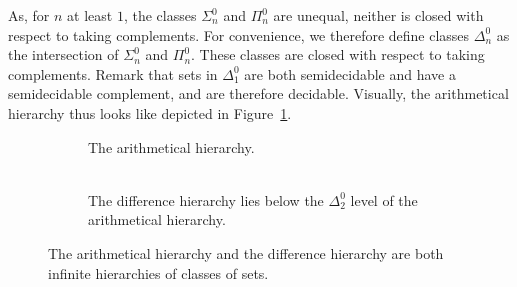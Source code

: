 As, for $n$ at least $1$, the classes $\Sigma^0_n$ and $\Pi^0_n$ are unequal, neither is closed with respect to taking complements.
For convenience, we therefore define classes $\Delta^0_n$ as the intersection of $\Sigma^0_n$ and $\Pi^0_n$.
These classes are closed with respect to taking complements.
Remark that sets in $\Delta^0_1$ are both semidecidable and have a semidecidable complement, and are therefore decidable.
Visually, the arithmetical hierarchy thus looks like depicted in Figure~\ref{fig:arithmetical_hierarchy}.
\begin{figure}
  \centering
  \begin{subfigure}{0.4\textwidth}
    \centering
    \caption{
      The arithmetical hierarchy.
      \\\hspace{0pt} \\\hspace{0pt} %
    }
    \label{fig:arithmetical_hierarchy}
  \end{subfigure}
  \qquad
  \begin{subfigure}{0.4\textwidth}
    \centering
    \caption{
      The difference hierarchy lies below the $\Delta^0_2$ level of the arithmetical hierarchy.
    }
    \label{fig:difference_hierarchy}
  \end{subfigure}
  \caption{
    The arithmetical hierarchy and the difference hierarchy are both infinite hierarchies of classes of sets.
  }
\end{figure}

